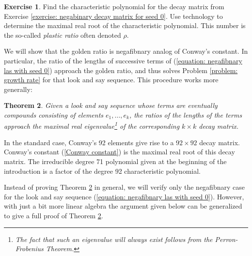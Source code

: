 \documentclass[reqno]{amsart}
\newtheorem{theorem}{Theorem}[section]
\theoremstyle{definition}
\newtheorem{exercise}[theorem]{Exercise}
\begin{document}
\begin{exercise}\label{exercise: negabinary plastic ratio as eigenvalue}
    Find the characteristic polynomial for the decay matrix from Exercise \ref{exercise: negabinary decay matrix for seed 0}. Use technology to determine the maximal real root of the characteristic polynomial. This number is the so-called \emph{plastic ratio} often denoted $\rho$.
\end{exercise}

We will show that the golden ratio is negafibnary analog of Conway's constant. In particular, the ratio of the lengths of successive terms of (\ref{equation: negafibnary las with seed 0}) approach the golden ratio, and thus solves Problem \ref{problem: growth rate} for that look and say sequence. This procedure works more generally: 

\begin{theorem}\label{theorem:: ratio of lengths approach max eigenvalue}
Given a look and say sequence whose terms are eventually compounds consisting of elements $e_1,\ldots,e_k$, the ratios of the lengths of the terms approach the maximal real eigenvalue\footnote{The fact that such an eigenvalue will always exist follows from the Perron-Frobenius Theorem.} of the corresponding $k\times k$ decay matrix. 
\end{theorem}

In the standard case, Conway's 92 elements give rise to a $92\times 92$ decay matrix. Conway's constant (\ref{Conway constant}) is the maximal real root of this decay matrix. The irreducible degree 71 polynomial given at the beginning of the introduction is a factor of the degree 92 characteristic polynomial.

Instead of proving Theorem \ref{theorem:: ratio of lengths approach max eigenvalue} in general, we will verify only the negafibnary case for the look and say sequence (\ref{equation: negafibnary las with seed 0}). However, with just a bit more linear algebra the argument given below can be generalized to give a full proof of Theorem \ref{theorem:: ratio of lengths approach max eigenvalue}. 

\bigskip
\end{document}
